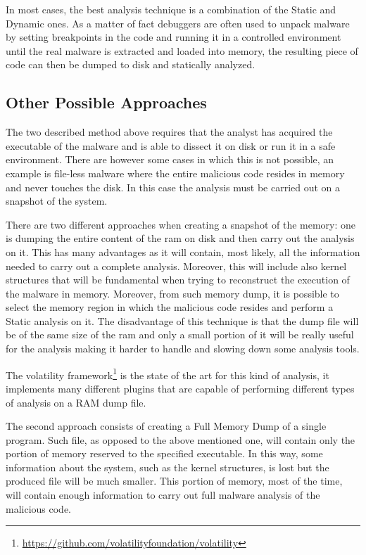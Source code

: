 In most cases, the best analysis technique is a combination of the Static and Dynamic ones. As a matter of fact debuggers are often used to unpack malware by setting breakpoints in the code and running it in a controlled environment until the real malware is extracted and loaded into memory, the resulting piece of code can then be dumped to disk and statically analyzed.

\subsection{Other Possible Approaches}

The two described method above requires that the analyst has acquired the executable of the malware and is able to dissect it on disk or run it in a safe environment. There are however some cases in which this is not possible, an example is file-less malware where the entire malicious code resides in memory and never touches the disk. In this case the analysis must be carried out on a snapshot of the system. 

There are two different approaches when creating a snapshot of the memory: one is dumping the entire content of the ram on disk and then carry out the analysis on it. This has many advantages as it will contain, most likely, all the information needed to carry out a complete analysis. Moreover, this will include also kernel structures that will be fundamental when trying to reconstruct the execution of the malware in memory. Moreover, from such memory dump, it is possible to select the memory region in which the malicious code resides and perform a Static analysis on it. The disadvantage of this technique is that the dump file will be of the same size of the ram and only a small portion of it will be really useful for the analysis making it harder to handle and slowing down some analysis tools. 

The volatility framework\footnote{\url{https://github.com/volatilityfoundation/volatility}} is the state of the art for this kind of analysis, it implements many different plugins that are capable of performing different types of analysis on a RAM dump file. 

The second approach consists of creating a Full Memory Dump of a single program. Such file, as opposed to the above mentioned one, will contain only the portion of memory reserved to the specified executable. In this way, some information about the system, such as the kernel structures, is lost but the produced file will be much smaller. This portion of memory, most of the time, will contain enough information to carry out full malware analysis of the malicious code.   

